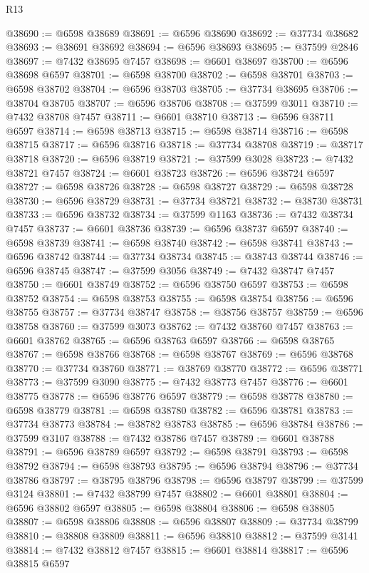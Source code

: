 \begin{lexlean}{R13}
\begin{coremodule}
@38690 := @6598 @38689
@38691 := @6596 @38690
@38692 := @37734 @38682
@38693 := @38691 @38692
@38694 := @6596 @38693
@38695 := @37599 @2846
@38697 := @7432 @38695 @7457
@38698 := @6601 @38697
@38700 := @6596 @38698 @6597
@38701 := @6598 @38700
@38702 := @6598 @38701
@38703 := @6598 @38702
@38704 := @6596 @38703
@38705 := @37734 @38695
@38706 := @38704 @38705
@38707 := @6596 @38706
@38708 := @37599 @3011
@38710 := @7432 @38708 @7457
@38711 := @6601 @38710
@38713 := @6596 @38711 @6597
@38714 := @6598 @38713
@38715 := @6598 @38714
@38716 := @6598 @38715
@38717 := @6596 @38716
@38718 := @37734 @38708
@38719 := @38717 @38718
@38720 := @6596 @38719
@38721 := @37599 @3028
@38723 := @7432 @38721 @7457
@38724 := @6601 @38723
@38726 := @6596 @38724 @6597
@38727 := @6598 @38726
@38728 := @6598 @38727
@38729 := @6598 @38728
@38730 := @6596 @38729
@38731 := @37734 @38721
@38732 := @38730 @38731
@38733 := @6596 @38732
@38734 := @37599 @1163
@38736 := @7432 @38734 @7457
@38737 := @6601 @38736
@38739 := @6596 @38737 @6597
@38740 := @6598 @38739
@38741 := @6598 @38740
@38742 := @6598 @38741
@38743 := @6596 @38742
@38744 := @37734 @38734
@38745 := @38743 @38744
@38746 := @6596 @38745
@38747 := @37599 @3056
@38749 := @7432 @38747 @7457
@38750 := @6601 @38749
@38752 := @6596 @38750 @6597
@38753 := @6598 @38752
@38754 := @6598 @38753
@38755 := @6598 @38754
@38756 := @6596 @38755
@38757 := @37734 @38747
@38758 := @38756 @38757
@38759 := @6596 @38758
@38760 := @37599 @3073
@38762 := @7432 @38760 @7457
@38763 := @6601 @38762
@38765 := @6596 @38763 @6597
@38766 := @6598 @38765
@38767 := @6598 @38766
@38768 := @6598 @38767
@38769 := @6596 @38768
@38770 := @37734 @38760
@38771 := @38769 @38770
@38772 := @6596 @38771
@38773 := @37599 @3090
@38775 := @7432 @38773 @7457
@38776 := @6601 @38775
@38778 := @6596 @38776 @6597
@38779 := @6598 @38778
@38780 := @6598 @38779
@38781 := @6598 @38780
@38782 := @6596 @38781
@38783 := @37734 @38773
@38784 := @38782 @38783
@38785 := @6596 @38784
@38786 := @37599 @3107
@38788 := @7432 @38786 @7457
@38789 := @6601 @38788
@38791 := @6596 @38789 @6597
@38792 := @6598 @38791
@38793 := @6598 @38792
@38794 := @6598 @38793
@38795 := @6596 @38794
@38796 := @37734 @38786
@38797 := @38795 @38796
@38798 := @6596 @38797
@38799 := @37599 @3124
@38801 := @7432 @38799 @7457
@38802 := @6601 @38801
@38804 := @6596 @38802 @6597
@38805 := @6598 @38804
@38806 := @6598 @38805
@38807 := @6598 @38806
@38808 := @6596 @38807
@38809 := @37734 @38799
@38810 := @38808 @38809
@38811 := @6596 @38810
@38812 := @37599 @3141
@38814 := @7432 @38812 @7457
@38815 := @6601 @38814
@38817 := @6596 @38815 @6597

\end{coremodule}
\end{lexlean}
